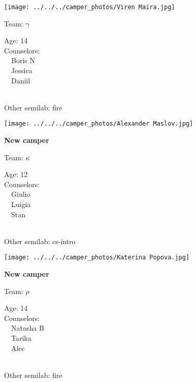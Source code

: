 \documentclass[10pt,letterpaper, landscape]{article}
\begin{document}
\horizontalshiftfornextsticker
\renewcommand{\baselinestretch}{1} \begin{sticker}
\noindent\begin{minipage}{0.5\textwidth}\texttt{[image: ../../../camper\_photos/Viren Maira.jpg]}\end{minipage}\begin{minipage}{0.45\textwidth}
Team: {\Large $\gamma$}

Age:        14\\
Counselors: \\\ \ Boris N\\\ \ Jessica\\\ \ Daniil\\
\end{minipage} \\ \vspace{0.07in}
Other semilab: fire
\end{sticker}
\horizontalshiftfornextsticker
\renewcommand{\baselinestretch}{1} \begin{sticker}
\noindent\begin{minipage}{0.5\textwidth}\texttt{[image: ../../../camper\_photos/Alexander Maslov.jpg]}\end{minipage}\begin{minipage}{0.45\textwidth}
\textbf{New camper} 

Team: {\Large $\kappa$}

Age:        12\\
Counselors: \\\ \ Giulio\\\ \ Luigia\\\ \ Stan\\
\end{minipage} \\ \vspace{0.07in}
Other semilab: cs-intro
\end{sticker}
\horizontalshiftfornextsticker
\renewcommand{\baselinestretch}{1} \begin{sticker}
\noindent\begin{minipage}{0.5\textwidth}\texttt{[image: ../../../camper\_photos/Katerina Popova.jpg]}\end{minipage}\begin{minipage}{0.45\textwidth}
\textbf{New camper} 

Team: {\Large $\rho$}

Age:        14\\
Counselors: \\\ \ Natasha B\\\ \ Tarika\\\ \ Alec\\
\end{minipage} \\ \vspace{0.07in}
Other semilab: fire
\end{sticker}
\end{document}
